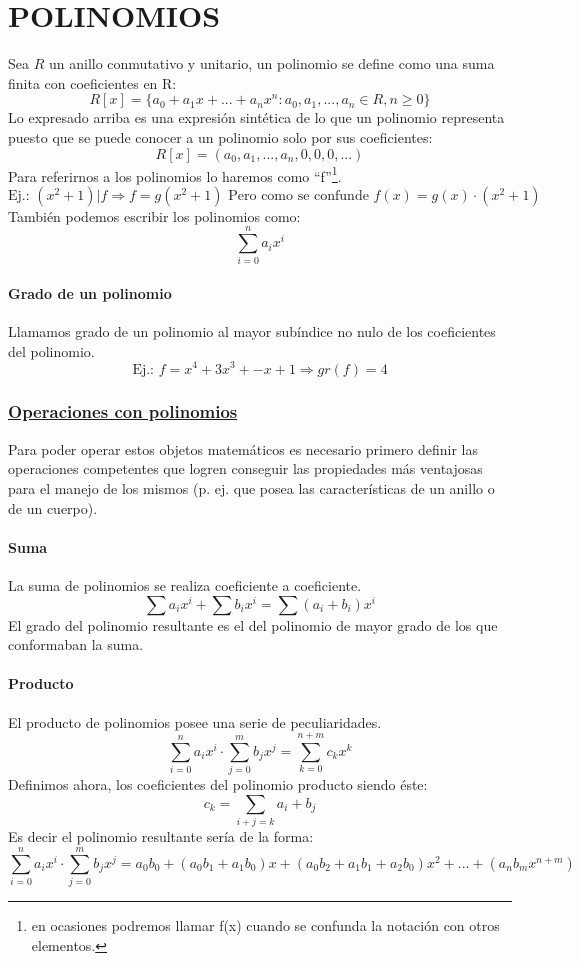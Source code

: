 \documentclass[10pt,a4paper,openright]{book}
\begin{document}
\chapter*{POLINOMIOS}
Sea $R$ un anillo conmutativo y unitario, un polinomio se define como una suma finita con coeficientes en R:
$$R[x]=\{a_0+a_1x+...+a_nx^n : a_0,a_1,...,a_n\in R, n\geq 0\}$$
Lo expresado arriba es una expresión sintética de lo que un polinomio representa puesto que se puede conocer a un polinomio solo por sus coeficientes:
$$R[x]=(a_0,a_1,...,a_n,0,0,0,...)$$
Para referirnos a los polinomios lo haremos como ``f''\footnote{en ocasiones podremos llamar f(x) cuando se confunda la notación con otros elementos.}.
$$\mbox{Ej.: } (x^2+1)|f\Rightarrow f=g(x^2+1) \mbox{ Pero como se confunde } f(x)=g(x)\cdot (x^2+1)$$
También podemos escribir los polinomios como:
$$\sum_{i=0}^{n} a_ix^i$$

\subsubsection*{Grado de un polinomio}
Llamamos grado de un polinomio al mayor subíndice no nulo de los coeficientes del polinomio.
$$\mbox{Ej.: } f=x^4+3x^3+-x+1 \Rightarrow gr(f)=4$$

\subsection*{\underline {Operaciones con polinomios}}
Para poder operar estos objetos matemáticos es necesario primero definir las operaciones competentes que logren conseguir las propiedades más ventajosas para el manejo de los mismos (p. ej. que posea las características de un anillo o de un cuerpo).
\subsubsection*{Suma}
La suma de polinomios se realiza coeficiente a coeficiente.
$$\sum a_ix^i+\sum b_ix^i=\sum (a_i+b_i)x^i$$
El grado del polinomio resultante es el del polinomio de mayor grado de los que conformaban la suma.

\subsubsection*{Producto}
El producto de polinomios posee una serie de peculiaridades.
$$\sum_{i=0}^n a_ix^i\cdot \sum_{j=0}^m b_jx^j=\sum_{k=0}^{n+m} c_kx^k$$
Definimos ahora, los coeficientes del polinomio producto siendo éste:
$$c_k=\sum_{i+j=k} a_i+b_j$$
Es decir el polinomio resultante sería de la forma:
$$\sum_{i=0}^n a_ix^i\cdot \sum_{j=0}^m b_jx^j=a_0b_0+(a_0b_1+a_1b_0)x+(a_0b_2+a_1b_1+a_2b_0)x^2+...+(a_nb_mx^{n+m})$$
\end{document}
